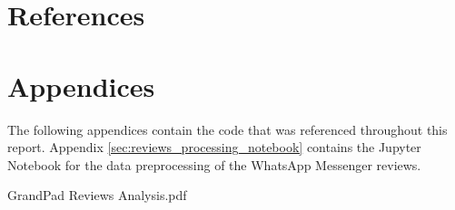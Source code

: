 \documentclass[12pt]{article}
\begin{document}
    \pagebreak

    

    

    \fancyhead{}

    \part*{References}
    \begingroup
        \def\section*#1{}
        
        
    \endgroup

    \pagebreak

    \part*{Appendices}
        \begin{appendices}
            The following appendices contain the code that was referenced
                throughout this report.
            Appendix \ref{sec:reviews_processing_notebook} contains the Jupyter
                Notebook for the data preprocessing of the WhatsApp Messenger
                reviews.

            
            {GrandPad Reviews Analysis.pdf}
        \end{appendices}
\end{document}

